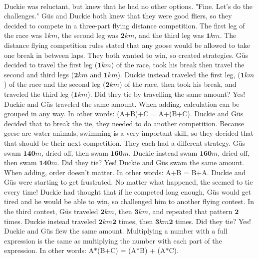 \paragraph{} Duckie was reluctant, but knew that he had no other options. "Fine. Let's do the challenges."
\pagebreak
{}
{Güs and Duckie both knew that they were good fliers, so they decided to compete in a three-part flying distance competition. The first leg of the race was $1 km$, the second leg was $\mathbf{2} km$, and the third leg was $\mathbf{1} km$. The distance flying competition rules stated that any goose would be allowed to take one break in between laps. They both wanted to win, so created strategies. Güs decided to travel the first leg ($\mathbf{1} km$) of the race, took his break then travel the second and third legs ($\mathbf{2} km$ and $\mathbf{1} km$). Duckie instead traveled the first leg, ($\mathbf{1} km$) of the race and the second leg ($\mathbf{2} km$) of the race, then took his break, and traveled the third leg ($\mathbf{1} km$). Did they tie by travelling the same amount?}
{Yes! Duckie and Güs traveled the same amount.}
{When adding, calculation can be grouped in any way. In other words: (A+B)+C = A+(B+C).}
{}
{Duckie and Güs decided that to break the tie, they needed to do another competition. \linebreak Because geese are water animals, swimming is a very important skill, so they decided that that should be their next competition. They each had a different strategy. Güs swam $\mathbf{140} m$, dried off, then swam $\mathbf{160} m$. Duckie instead swam $\mathbf{160} m$, dried off, then swam $\mathbf{140} m$. Did they tie?}
{Yes! Duckie and Güs swam the same amount.}
{When adding, order doesn't matter. In other words: A+B = B+A.}
{}
{Duckie and Güs were starting to get frustrated. No matter what happened, the seemed to tie every time! Duckie had thought that if he competed long enough, Güs would get tired and he would be able to win, so challenged him to another flying contest. In the third contest, Güs traveled $\mathbf{2} km$, then $\mathbf{3} km$, and repeated that pattern $\mathbf{2}$ times. Duckie instead traveled $\mathbf{2} km  \mathbf{2}$ times, then $\mathbf{3} km  \mathbf{2}$ times. Did they tie?}
{Yes! Duckie and Güs flew the same amount.}
{Multiplying a number with a full expression is the same as multiplying the number with each part of the expression. In other words: A$\ast$(B+C) = (A$\ast$B) + (A$\ast$C).}
